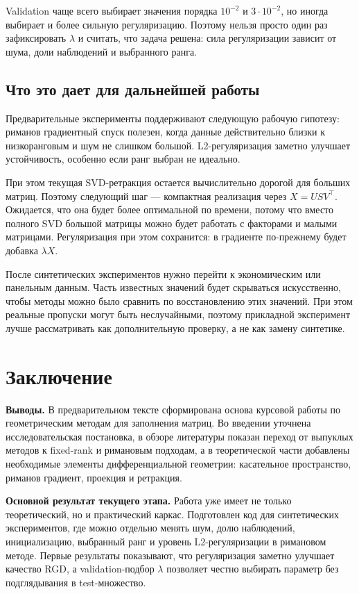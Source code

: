 \documentclass[a4paper,12pt]{article}
\begin{document}
Validation чаще всего выбирает значения порядка $10^{-2}$ и $3\cdot10^{-2}$, но иногда выбирает и более сильную регуляризацию. Поэтому нельзя просто один раз зафиксировать $\lambda$ и считать, что задача решена: сила регуляризации зависит от шума, доли наблюдений и выбранного ранга.

\subsection{Что это дает для дальнейшей работы}

Предварительные эксперименты поддерживают следующую рабочую гипотезу: риманов градиентный спуск полезен, когда данные действительно близки к низкоранговым и шум не слишком большой. L2-регуляризация заметно улучшает устойчивость, особенно если ранг выбран не идеально.

При этом текущая SVD-ретракция остается вычислительно дорогой для больших матриц. Поэтому следующий шаг --- компактная реализация через $X=USV^\top$. Ожидается, что она будет более оптимальной по времени, потому что вместо полного SVD большой матрицы можно будет работать с факторами и малыми матрицами. Регуляризация при этом сохранится: в градиенте по-прежнему будет добавка $\lambda X$.

После синтетических экспериментов нужно перейти к экономическим или панельным данным. Часть известных значений будет скрываться искусственно, чтобы методы можно было сравнить по восстановлению этих значений. При этом реальные пропуски могут быть неслучайными, поэтому прикладной эксперимент лучше рассматривать как дополнительную проверку, а не как замену синтетике.

\newpage

\section*{Заключение}
{}

\textbf{Выводы.} В предварительном тексте сформирована основа курсовой работы по геометрическим методам для заполнения матриц. Во введении уточнена исследовательская постановка, в обзоре литературы показан переход от выпуклых методов к fixed-rank и римановым подходам, а в теоретической части добавлены необходимые элементы дифференциальной геометрии: касательное пространство, риманов градиент, проекция и ретракция.

\textbf{Основной результат текущего этапа.} Работа уже имеет не только теоретический, но и практический каркас. Подготовлен код для синтетических экспериментов, где можно отдельно менять шум, долю наблюдений, инициализацию, выбранный ранг и уровень L2-регуляризации в римановом методе. Первые результаты показывают, что регуляризация заметно улучшает качество RGD, а validation-подбор $\lambda$ позволяет честно выбирать параметр без подглядывания в test-множество.
\end{document}
